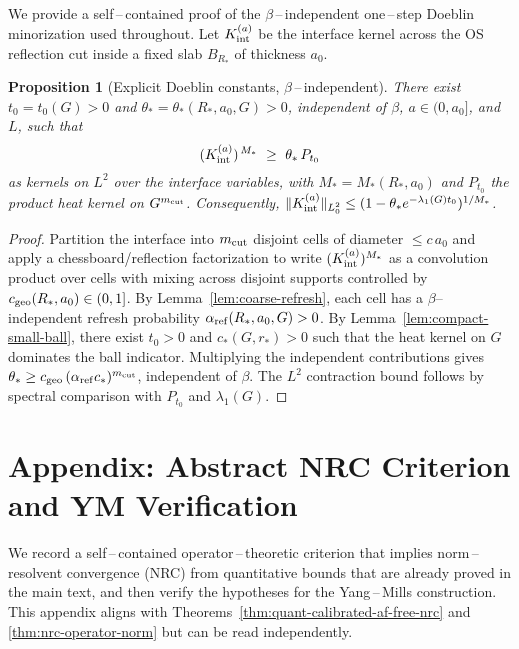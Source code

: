 \documentclass[11pt]{amsart}
\theoremstyle{plain}
\newtheorem{proposition}[theorem]{Proposition}
\theoremstyle{definition}
\theoremstyle{remark}
\begin{document}
We provide a self\,–\,contained proof of the $\beta$\,–\,independent one\,–\,step Doeblin minorization used throughout. Let $K^{(a)}_{\rm int}$ be the interface kernel across the OS reflection cut inside a fixed slab $B_{R_*}$ of thickness $a_0$.

\begin{proposition}[Explicit Doeblin constants, $\beta$\,–\,independent]\label{prop:explicit-doeblin-constants-appendix}
There exist $t_0=t_0(G)>0$ and $\theta_*=\theta_*(R_*,a_0,G)>0$, independent of $\beta$, $a\in(0,a_0]$, and $L$, such that
\[
  (K^{(a)}_{\rm int})^{\,M_*}\ \ge\ \theta_*\, P_{t_0}
\]
as kernels on $L^2$ over the interface variables, with $M_*=M_*(R_*,a_0)$ and $P_{t_0}$ the product heat kernel on $G^{m_{\rm cut}}$. Consequently, $\|K^{(a)}_{\rm int}\|_{L^2_0}\le (1-\theta_* e^{-\lambda_1(G)t_0})^{1/M_*}$.
\end{proposition}
\begin{proof}
Partition the interface into $m_{\rm cut}$ disjoint cells of diameter $\le c\,a_0$ and apply a chessboard/reflection factorization to write $(K^{(a)}_{\rm int})^{M_*}$ as a convolution product over cells with mixing across disjoint supports controlled by $c_{\rm geo}(R_*,a_0)\in(0,1]$. By Lemma~\ref{lem:coarse-refresh}, each cell has a $\beta$--independent refresh probability $\alpha_{\rm ref}(R_*,a_0,G)>0$. By Lemma~\ref{lem:compact-small-ball}, there exist $t_0>0$ and $c_*(G,r_*)>0$ such that the heat kernel on $G$ dominates the ball indicator. Multiplying the independent contributions gives $\theta_*\ge c_{\rm geo}\,(\alpha_{\rm ref} c_*)^{m_{\rm cut}}$, independent of $\beta$. The $L^2$ contraction bound follows by spectral comparison with $P_{t_0}$ and $\lambda_1(G)$.
\end{proof}

\section{Appendix: Abstract NRC Criterion and YM Verification}
\label{app:nrc-abstract}

We record a self\,--\,contained operator\,--\,theoretic criterion that implies norm\,--\,resolvent convergence (NRC) from quantitative bounds that are already proved in the main text, and then verify the hypotheses for the Yang\,--\,Mills construction. This appendix aligns with Theorems~\ref{thm:quant-calibrated-af-free-nrc} and \ref{thm:nrc-operator-norm} but can be read independently.
\end{document}
